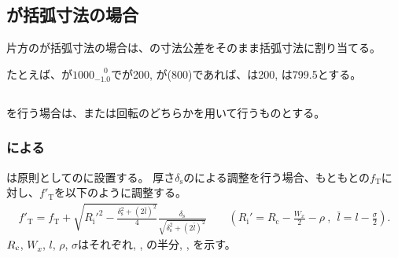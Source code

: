 \subsection{\AlocationLength が括弧寸法の場合}
片方の\AlocationLength が括弧寸法の場合は、\WorkTotalLength の寸法公差をそのまま括弧寸法に割り当てる。
\begin{hosoku}
たとえば、\WorkTotalLength が$1000^{\phantom +0}_{-1.0}$で\TopAlocationLength が200, \BottomAlocationLength が(800)であれば、\TopAlocationLength は200, \BottomAlocationLength は799.5とする。
\end{hosoku}


\subsection{\AlocationAdjustment}
\AlocationAdjustment を行う場合は、\Spacer または\nameTable 回転のどちらかを用いて行うものとする。

\subsubsection{\indexSpacerAlocationAdjustment\nameSpacer による\nameAlocationAdjustment}
\Spacer は原則として\Jig の\TopSideReceiverPlate に設置する。
厚さ$\delta_\mathrm s$の\indexSpacerAlocationAdjustment\nameSpacer による調整を行う場合、もともとの\TopAlocationLength$f_\mathrm T$に対し、\TopReAlocationLength$f'_\mathrm T$を以下のように調整する。
\begin{align*}
  f'_\mathrm T
  = f_\mathrm T
    +\sqrt{R_\mathrm i'^2-\frac{\delta_\mathrm s^2+(2\bar l)^2}4}\frac{\delta_\mathrm s}{\sqrt{\delta_\mathrm s^2+(2\bar l)^2}}\qquad
    \left(R_\mathrm i' = R_\mathrm c-\frac{W_x}2-\rho~,~~\bar l = l-\frac\sigma2\right).
\end{align*}
$R_\textrm c$, $W_x$, $l$, $\rho$, $\sigma$はそれぞれ\CenterCurvatureRadius, \ACOD, \JigWidth の半分, \ReceiverPlateRadius, \ReceiverPlateWidth を示す。

